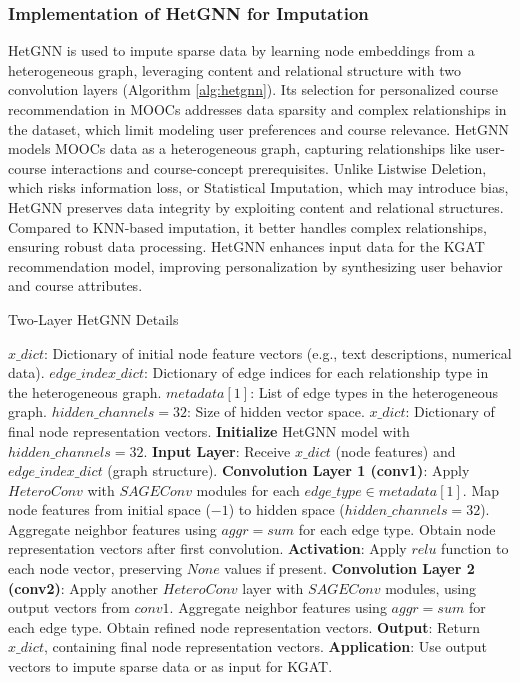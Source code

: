 \documentclass{ieeeaccess}
\begin{document}
\subsubsection{Implementation of HetGNN for Imputation}
HetGNN is used to impute sparse data by learning node embeddings from a heterogeneous graph, leveraging content and relational structure with two convolution layers (Algorithm \ref{alg:hetgnn}). Its selection for personalized course recommendation in MOOCs addresses data sparsity and complex relationships in the dataset, which limit modeling user preferences and course relevance. HetGNN models MOOCs data as a heterogeneous graph, capturing relationships like user-course interactions and course-concept prerequisites. Unlike Listwise Deletion, which risks information loss, or Statistical Imputation, which may introduce bias, HetGNN preserves data integrity by exploiting content and relational structures. Compared to KNN-based imputation, it better handles complex relationships, ensuring robust data processing. HetGNN enhances input data for the KGAT recommendation model, improving personalization by synthesizing user behavior and course attributes.

\begin{algorithm}
\caption{Two-Layer HetGNN Details}
\label{alg:hetgnn}
\small
\begin{algorithmic}[1]
\Require
    \State $x\_dict$: Dictionary of initial node feature vectors (e.g., text descriptions, numerical data).
    \State $edge\_index\_dict$: Dictionary of edge indices for each relationship type in the heterogeneous graph.
    \State $metadata[1]$: List of edge types in the heterogeneous graph.
    \State $hidden\_channels = 32$: Size of hidden vector space.
\Ensure
    \State $x\_dict$: Dictionary of final node representation vectors.
\State \textbf{Initialize} HetGNN model with $hidden\_channels = 32$.
\State \textbf{Input Layer}:
    \State Receive $x\_dict$ (node features) and $edge\_index\_dict$ (graph structure).
\State \textbf{Convolution Layer 1 (conv1)}:
    \State Apply $HeteroConv$ with $SAGEConv$ modules for each $edge\_type \in metadata[1]$.
    \State Map node features from initial space ($-1$) to hidden space ($hidden\_channels = 32$).
    \State Aggregate neighbor features using $aggr=sum$ for each edge type.
    \State Obtain node representation vectors after first convolution.
\State \textbf{Activation}:
    \State Apply $relu$ function to each node vector, preserving $None$ values if present.
\State \textbf{Convolution Layer 2 (conv2)}:
    \State Apply another $HeteroConv$ layer with $SAGEConv$ modules, using output vectors from $conv1$.
    \State Aggregate neighbor features using $aggr=sum$ for each edge type.
    \State Obtain refined node representation vectors.
\State \textbf{Output}:
    \State Return $x\_dict$, containing final node representation vectors.
\State \textbf{Application}:
    \State Use output vectors to impute sparse data or as input for KGAT.
\end{algorithmic}
\end{algorithm}
\end{document}
